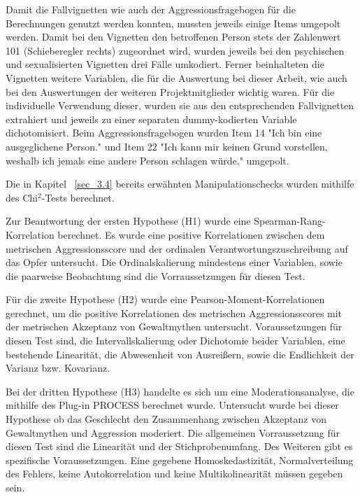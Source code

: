 Damit die Fallvignetten wie auch der Aggressionsfragebogen für die Berechnungen genutzt werden konnten, mussten jeweils einige Items umgepolt werden. Damit bei den Vignetten den betroffenen Person stets der Zahlenwert 101 (Schieberegler rechts) zugeordnet wird, wurden jeweils bei den psychischen und sexualisierten Vignetten drei Fälle umkodiert. Ferner beinhalteten die Vignetten weitere Variablen, die für die Auswertung bei dieser Arbeit, wie auch bei den Auswertungen der weiteren Projektmitglieder wichtig waren. Für die individuelle Verwendung dieser, wurden sie aus den entsprechenden Fallvignetten extrahiert und jeweils zu einer separaten dummy-kodierten Variable dichotomisiert. Beim Aggressionsfragebogen wurden Item 14 "Ich bin eine ausgeglichene Person." und Item 22 "Ich kann mir keinen Grund vorstellen, weshalb ich jemals eine andere Person schlagen würde." umgepolt.

Die in Kapitel ~\ref{sec_3.4} bereits erwähnten Manipulationschecks wurden mithilfe des Chi$^2$-Tests berechnet.

Zur Beantwortung der ersten Hypothese (H1) wurde eine Spearman-Rang-Korrelation berechnet. Es wurde eine positive Korrelationen zwischen dem metrischen Aggressionsscore und der ordinalen Verantwortungszuschreibung auf das Opfer untersucht. Die Ordinalskalierung mindestens einer Variablen, sowie die paarweise Beobachtung sind die Vorraussetzungen für diesen Test.

Für die zweite Hypothese (H2) wurde eine Pearson-Moment-Korrelationen gerechnet, um die positive Korrelationen des metrischen Aggressionsscores mit der metrischen Akzeptanz von Gewaltmythen untersucht. Voraussetzungen für diesen Test sind, die Intervallskalierung oder Dichotomie beider Variablen, eine bestehende Linearität, die Abwesenheit von Ausreißern, sowie die Endlichkeit der Varianz bzw. Kovarianz.

Bei der dritten Hypothese (H3) handelte es sich um eine Moderationsanalyse, die mithilfe des Plug-in PROCESS berechnet wurde. Untersucht wurde bei dieser Hypothese ob das Geschlecht den Zusammenhang zwischen Akzeptanz von Gewaltmythen und Aggression moderiert. Die allgemeinen Vorraussetzung für diesen Test sind die Linearität und der Stichprobenumfang. Des Weiteren gibt es spezifische Voraussetzungen. Eine gegebene Homoskedastizität, Normalverteilung des Fehlers, keine Autokorrelation und keine Multikolinearität müssen gegeben sein.